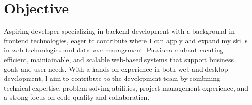 \documentclass[legal,10pt]{article}
\begin{document}
\section{Objective}
\begin{justify}
Aspiring developer specializing in backend development with a background in frontend technologies, eager to contribute where I can apply and expand my skills in web technologies and database management. Passionate about creating efficient, maintainable, and scalable web-based systems that support business goals and user needs. With a hands-on experience in both web and desktop development, I aim to contribute to the development team by combining technical expertise, problem-solving abilities, project management experience, and a strong focus on code quality and collaboration.
\end{justify}
\end{document}
